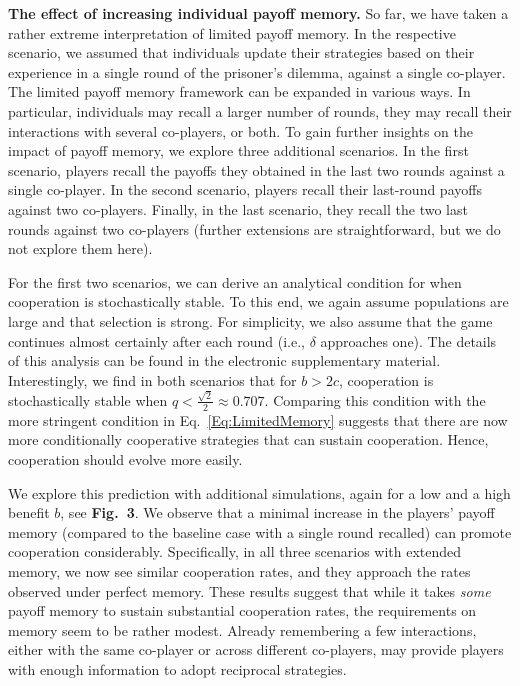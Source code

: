 \documentclass[11pt]{article}
\def\esm{electronic supplementary material}
\newcommand{\FigHigherMemory}{{\bf Fig.~3}}
\theoremstyle{plainCl1}
\theoremstyle{plainCl2}
\begin{document}
\noindent 
{\bf The effect of increasing individual payoff memory.}
So far, we have taken a rather extreme interpretation of limited payoff memory. 
In the respective scenario, we assumed that individuals update their strategies based on their experience in a single round of the prisoner's dilemma, against a single co-player. 
The limited payoff memory framework can be expanded in various ways. 
In particular, individuals may recall a larger number of rounds, they may recall their interactions with several co-players, or both. 
To gain further insights on the impact of payoff memory, we explore three additional scenarios. 
In the first scenario, players recall the payoffs they obtained in the last two rounds against a single co-player. 
In the second scenario, players recall their last-round payoffs against two co-players. 
Finally, in the last scenario, they recall the two last rounds against two co-players (further extensions are straightforward, but we do not explore them here). 


For the first two scenarios, we can derive an analytical condition for when cooperation is stochastically stable. 
To this end, we again assume populations are large and that selection is strong. 
For simplicity, we also assume that the game continues almost certainly after each round (i.e., $\delta$ approaches one). 
The details of this analysis can be found in the \esm. 
Interestingly, we find in both scenarios that for $b\!>\!2c$, cooperation is stochastically stable when $q\!<\! \frac{\sqrt{2}}{2}\approx 0.707$. 
Comparing this condition with the more stringent condition in Eq.~\eqref{Eq:LimitedMemory} suggests that there are now more conditionally cooperative strategies that can sustain cooperation. 
Hence, cooperation should evolve more easily. 


We explore this prediction with additional simulations, again for a low and a high benefit $b$, 
see \FigHigherMemory.
We observe that a minimal increase in the players' payoff memory (compared to the baseline case with a single round recalled) can promote cooperation considerably. 
Specifically, in all three scenarios with extended memory, we now see similar cooperation rates, and they approach the rates observed under perfect memory. 
These results suggest that while it takes {\it some} payoff memory to sustain substantial cooperation rates, the requirements on memory seem to be rather modest. 
Already remembering a few interactions, either with the same co-player or across different co-players, may provide players with enough information to adopt reciprocal strategies. 
\end{document}
